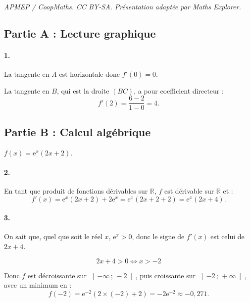 \documentclass[10pt]{article}
\providecommand{\e}{{\mathrm{e}}}
\begin{document}
\noindent\textit{APMEP / CoopMaths. CC BY-SA. Présentation adaptée par Maths Explorer.}\par\medskip
\subsection*{Partie A : Lecture graphique}

\paragraph{1.} La tangente en \(A\) est horizontale donc \(f'(0) = 0\).

La tangente en \(B\), qui est la droite \((BC)\), a pour coefficient directeur :
\[
f'(2) = \dfrac{6 - 2}{1 - 0} = 4.
\]

\subsection*{Partie B : Calcul algébrique}

\(f(x) = \e^x (2x + 2)\).

\paragraph{2.} En tant que produit de fonctions dérivables sur \(\mathbb{R}\), \(f\) est dérivable sur \(\mathbb{R}\) et :
\[
f'(x) = \e^x (2x + 2) + 2\e^x = \e^x(2x + 2 + 2) = \e^x(2x + 4).
\]

\paragraph{3.} On sait que, quel que soit le réel \(x\), \(\e^x > 0\), donc le signe de \(f'(x)\) est celui de \(2x + 4\).

\[
2x + 4 > 0 \iff x > -2
\]

Donc \(f\) est décroissante sur \(\left]-\infty\,;\,-2\right[\), puis croissante sur \(\left]-2\,;\,+\infty\right[\), avec un minimum en :
\[
f(-2) = \e^{-2}(2 \times (-2) + 2) = -2 \e^{-2} \approx -0{,}271.
\]

\begin{center}
\end{center}
\end{document}
